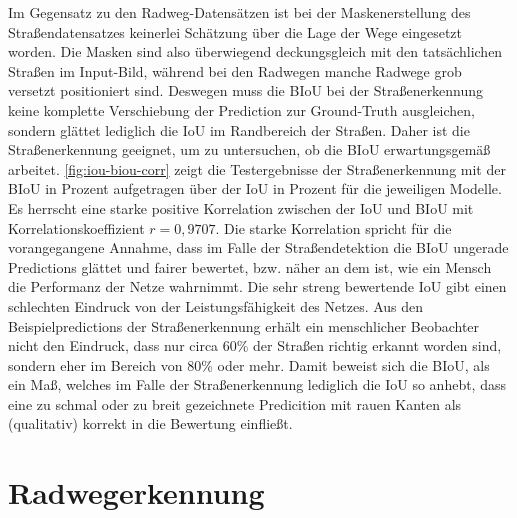 Im Gegensatz zu den Radweg-Datensätzen ist bei der Maskenerstellung des Straßendatensatzes keinerlei Schätzung 
über die Lage der Wege eingesetzt worden. Die Masken sind also überwiegend deckungsgleich mit den tatsächlichen 
Straßen im Input-Bild, während bei den Radwegen manche Radwege grob versetzt positioniert sind. 
Deswegen muss die BIoU bei der Straßenerkennung keine komplette Verschiebung der Prediction zur Ground-Truth ausgleichen, 
sondern glättet lediglich die IoU im Randbereich der Straßen. Daher ist die Straßenerkennung geeignet, 
um zu untersuchen, ob die BIoU erwartungsgemäß arbeitet. \autoref{fig:iou-biou-corr} zeigt die Testergebnisse der 
Straßenerkennung mit der BIoU in Prozent aufgetragen über der IoU in Prozent für die jeweiligen Modelle. 
Es herrscht eine starke positive Korrelation zwischen der IoU und BIoU mit Korrelationskoeffizient $r = 0,9707$. 
Die starke Korrelation spricht für die vorangegangene Annahme, dass im Falle der Straßendetektion die BIoU 
ungerade Predictions glättet und fairer bewertet, bzw. näher an dem ist, wie ein Mensch die Performanz der 
Netze wahrnimmt. Die sehr streng bewertende IoU gibt einen schlechten Eindruck von der Leistungsfähigkeit des Netzes. 
Aus den Beispielpredictions der Straßenerkennung erhält ein menschlicher Beobachter nicht den Eindruck, 
dass nur circa 60\% der Straßen richtig erkannt worden sind, sondern eher im Bereich von 80\% oder mehr. 
Damit beweist sich die BIoU, als ein Maß, welches im Falle der Straßenerkennung lediglich die IoU so anhebt, 
dass eine zu schmal oder zu breit gezeichnete Predicition mit rauen Kanten als (qualitativ) korrekt in 
die Bewertung einfließt.  

\section{Radwegerkennung} \label{sec:disc:recog}

